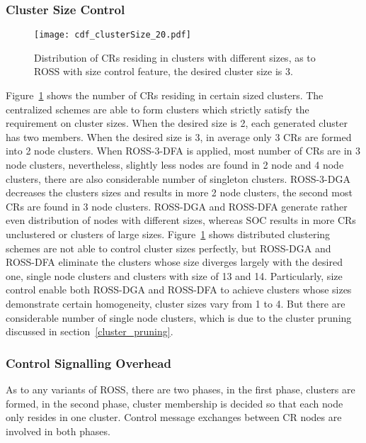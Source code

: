 

\subsubsection{Cluster Size Control}
\label{cluster_size}
\begin{figure}[ht!]
  \centering
  \texttt{[image: cdf\_clusterSize\_20.pdf]}
  \caption{Distribution of CRs residing in clusters with different sizes, as to ROSS with size control feature, the desired cluster size is 3.}
  \label{size_control}
\end{figure}
Figure~\ref{size_control} shows the number of CRs residing in certain sized clusters.
The centralized schemes are able to form clusters which strictly satisfy the requirement on cluster sizes.
When the desired size is 2, each generated cluster has two members.
When the desired size is 3, in average only 3 CRs are formed into 2 node clusters.
When ROSS-3-DFA is applied, most number of CRs are in 3 node clusters, nevertheless, slightly less nodes are found in 2 node and 4 node clusters, there are also considerable number of singleton clusters.
ROSS-3-DGA decreases the clusters sizes and results in more 2 node clusters, the second most CRs are found in 3 node clusters.
ROSS-DGA and ROSS-DFA generate rather even distribution of nodes with different sizes, whereas SOC results in more CRs unclustered or clusters of large sizes. 
Figure~\ref{size_control} shows distributed clustering schemes are not able to control cluster sizes perfectly, but ROSS-DGA and ROSS-DFA eliminate the clusters whose size diverges largely with the desired one, \ie single node clusters and clusters with size of 13 and 14.
Particularly, size control enable both ROSS-DGA and ROSS-DFA to achieve clusters whose sizes demonstrate certain homogeneity, \ie cluster sizes vary from 1 to 4.
But there are considerable number of single node clusters, which is due to the cluster pruning discussed in section~\ref{cluster_pruning}.

\subsubsection{Control Signalling Overhead}
As to any variants of ROSS, there are two phases, in the first phase, clusters are formed, in the second phase, cluster membership is decided so that each node only resides in one cluster.
Control message exchanges between CR nodes are involved in both phases.

